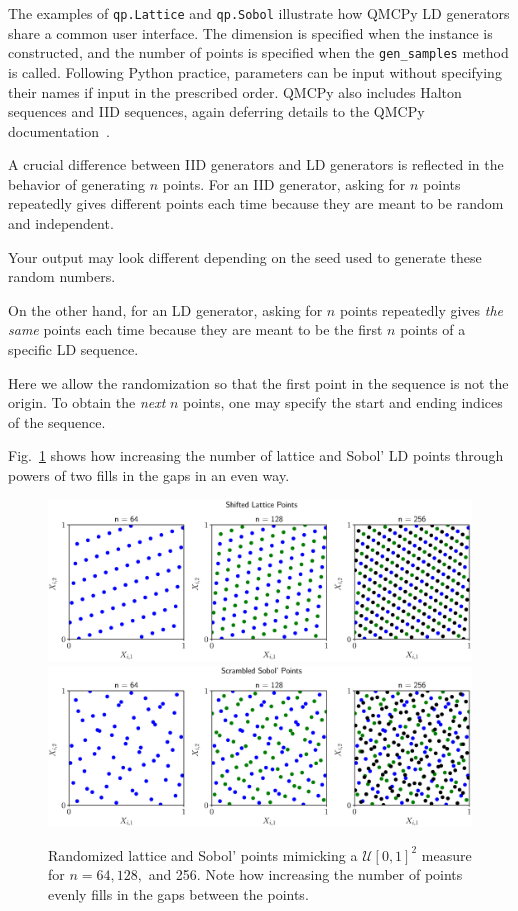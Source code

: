 \documentclass[graybox]{svmult}
\begin{document}
The examples of \texttt{qp.Lattice} and \texttt{qp.Sobol} illustrate how QMCPy LD generators share a common user interface.  The dimension is specified when the instance is constructed, and the number of points is specified when the \texttt{gen\_samples} method is called.  Following Python practice, parameters can be input without specifying their names if input in the prescribed order.  QMCPy also includes Halton sequences and IID sequences, again deferring details to the QMCPy documentation~\cite{QMCPyDocs}.

A crucial difference between IID generators and LD generators is reflected in the behavior of generating $n$ points.  For an IID generator, asking for $n$ points repeatedly gives different points each time because they are meant to be random and independent.

Your output may look different depending on the seed used to generate these random numbers.

On the other hand, for an LD generator, asking for $n$ points repeatedly gives \emph{the same} points each time because they are meant to be the first $n$ points of a specific LD sequence.  

Here we allow the randomization so that the first point in the sequence is not the origin.  To obtain the \emph{next} $n$ points, one may specify the start and ending indices of the sequence.


Fig.~\ref{fig:increase_n} shows how increasing the number of lattice and Sobol' LD points through powers of two fills in the gaps in an even way.

\begin{figure}[t]
	\includegraphics[width=1\textwidth]{QMCSoftwareArticle/vfigs/dd_lattice_successive.eps}
	\qquad
	\includegraphics[width=1\textwidth]{QMCSoftwareArticle/vfigs/dd_sobol_successive.eps}
	\caption{Randomized lattice and Sobol' points mimicking a $\mathcal{U}[0,1]^2$ measure for $n = 64, 128,$ and 256. Note how increasing the number of points evenly fills in the gaps between the points.}
	\label{fig:increase_n}
\end{figure}
\end{document}
